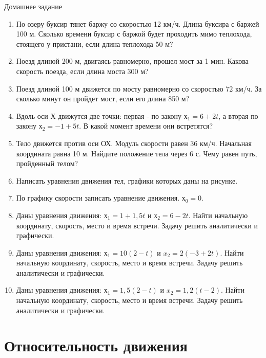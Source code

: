 \documentclass[a5paper, 10pt]{diss_4}
\renewcommand{\'}{\,'}
\begin{document}
\begin{center}
   Домашнее задание
\end{center}
\begin{enumerate}
\item По озеру буксир тянет баржу со скоростью 12 км/ч. Длина буксира с баржей
100 м. Сколько времени буксир с баржой будет проходить мимо теплохода, стоящего
у пристани, если длина теплохода 50 м?

\item Поезд длиной 200 м, двигаясь равномерно, прошел мост за 1 мин. Какова
скорость поезда, если длина моста 300 м?

\item Поезд длиной 100 м движется по мосту равномерно со скоростью 72 км/ч. За
сколько минут он пройдет мост, если его длина 850 м?

\item Вдоль оси Х движутся две точки: первая - по закону $х_1 = 6 + 2t$, а
 вторая по закону $х_2 = -1 + 5t$. В какой момент времени они встретятся?

\item Тело движется против оси ОХ. Модуль скорости равен 36 км/ч. Начальная
координата равна 10 м. Найдите положение тела через 6 с. Чему равен путь, пройденный телом?

\item Написать уравнения движения тел, графики которых даны на рисунке.

\item По графику скорости записать уравнение движения. $х_0=0$.

\item Даны уравнения движения: $х_1= 1+1,5t$ и $х_2= 6- 2t$. Найти начальную
 координату, скорость, место и время встречи. Задачу решить аналитически и
 графически.

\item Даны уравнения движения: $х_1 = 10(2-t)$ и $x_2=2(-3+2t)$. Найти
начальную координату, скорость, место и время встречи. Задачу решить
аналитически и графически.

\item Даны уравнения движения: $х_1 = 1,5(2-t)$ и $x_2 = 1,2(t -2)$. Найти
начальную координату, скорость, место и время встречи. Задачу решить
аналитически и графически.
\end{enumerate}

\section{Относительность движения}
\end{document}
